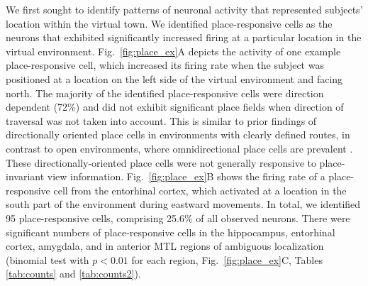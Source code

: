 % 
We first sought to identify patterns of neuronal activity that represented subjects' location within the virtual town. We identified place-responsive cells as the neurons that exhibited significantly increased firing at a particular location in the virtual environment. Fig.~\ref{fig:place_ex}A depicts the activity of one example place-responsive cell, which increased its firing rate when the subject was positioned at a location on the left side of the virtual environment and facing north.  The majority of the identified place-responsive cells were direction dependent (72\%) and did not exhibit significant place fields when direction of traversal was not taken into account.  This is similar to prior findings of directionally oriented place cells in environments with clearly defined routes, in contrast to open environments, where omnidirectional place cells are prevalent \cite{MullEtal94,EkstEtal03}.  These directionally-oriented place cells were not generally responsive to place-invariant view information. Fig.~\ref{fig:place_ex}B shows the firing rate of a place-responsive cell from the entorhinal cortex, which activated at a location in the south part of the environment during eastward movements.  In total, we identified 95 place-responsive cells, comprising 25.6\% of all observed neurons. There were significant numbers of place-responsive cells in the hippocampus, entorhinal cortex, amygdala, and in anterior MTL regions of ambiguous localization (binomial test with $p<0.01$ for each region, Fig.~\ref{fig:place_ex}C, Tables \ref{tab:counts} and \ref{tab:counts2}).

